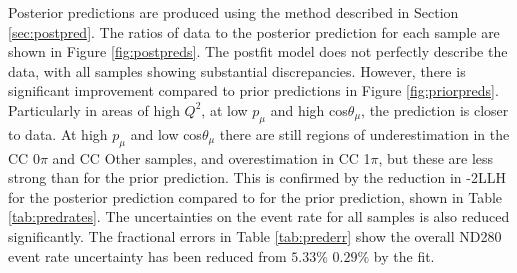 Posterior predictions are produced using the method described in Section \ref{sec:postpred}. The ratios of data to the posterior prediction for each sample are shown in Figure \ref{fig:postpreds}. The postfit model does not perfectly describe the data, with all samples showing substantial discrepancies. However, there is significant improvement compared to prior predictions in Figure \ref{fig:priorpreds}. Particularly in areas of high $Q^2$, at low $p_{\mu}$ and high cos$\theta_{\mu}$, the prediction is closer to data. At high $p_{\mu}$ and low cos$\theta_{\mu}$ there are still regions of underestimation in the CC 0$\pi$ and CC Other samples, and overestimation in CC 1$\pi$, but these are less strong than for the prior prediction. This is confirmed by the reduction in -2LLH for the posterior prediction compared to for the prior prediction, shown in Table \ref{tab:predrates}. The uncertainties on the event rate for all samples is also reduced significantly. The fractional errors in Table \ref{tab:prederr} show the overall ND280 event rate uncertainty has been reduced from $5.33\%$ $0.29\%$ by the fit.

